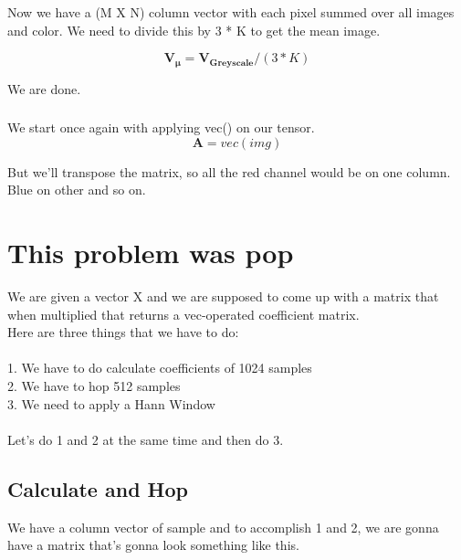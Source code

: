 \documentclass{article}
\newcommand{\matr}[1]{\mathbf{#1}}
\begin{document}
		Now we have a (M X N) column vector with each pixel summed over all images and color. We need to divide this by 3 * K to get the mean
		image.

		\begin{equation*}
		\matr{V_{\mu}} = \matr{V_{Greyscale}} / (3*K) 
		\end{equation*}	

		We are done.

		\subsubsection{} %
	
		We start once again with applying vec() on our tensor.\\

		\begin{equation*}
		\matr{A} = vec(img)
		\end{equation*}
		
		But we'll transpose the matrix, so all the red channel would be on one column. Blue on other and so on. 
		
\section{This problem was pop}
	We are given a vector X and we are supposed to come up with a matrix that when multiplied that returns a vec-operated coefficient matrix.\\
	Here are three things that we have to do:\\
	\\
	1. We have to do calculate coefficients of 1024 samples\\
	2. We have to hop 512 samples\\
	3. We need to apply a Hann Window\\
	\\
	Let's do 1 and 2 at the same time and then do 3.

	\subsection{Calculate and Hop}
		We have a column vector of sample and to accomplish 1 and 2, we are gonna have a matrix that's gonna look something like this.
		
\end{document}
